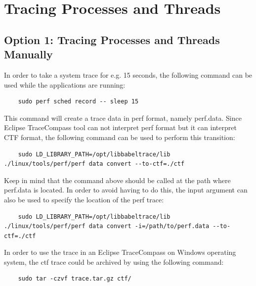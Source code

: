 \section{Tracing Processes and Threads}
\subsection{Option 1: Tracing Processes and Threads Manually}
In order to take a system trace for e.g. 15 seconds, the following command can be used while the applications are running:
\begin{lstlisting}
	sudo perf sched record -- sleep 15
\end{lstlisting}
This command will create a trace data in perf format, namely perf.data. Since Eclipse TraceCompass tool can not interpret perf format but it can interpret CTF format, the following command can be used to perform this transition:
\begin{lstlisting}
	sudo LD_LIBRARY_PATH=/opt/libbabeltrace/lib ./linux/tools/perf/perf data convert --to-ctf=./ctf
\end{lstlisting}
Keep in mind that the command above should be called at the path where perf.data is located. In order to avoid having to do this, the input argument can also be used to specify the location of the perf trace:
\begin{lstlisting}
	sudo LD_LIBRARY_PATH=/opt/libbabeltrace/lib ./linux/tools/perf/perf data convert -i=/path/to/perf.data --to-ctf=./ctf
\end{lstlisting}
In order to use the trace in an Eclipse TraceCompass on Windows operating system, the ctf trace could be archived by using the following command:
\begin{lstlisting}
	sudo tar -czvf trace.tar.gz ctf/
\end{lstlisting}

